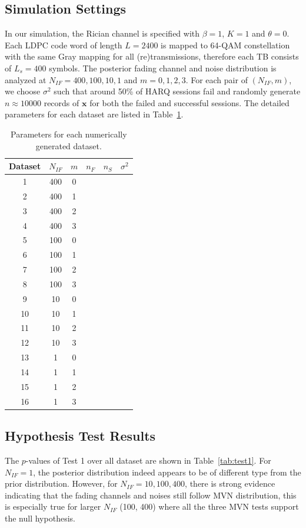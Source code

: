 \documentclass[journal,draftcls,onecolumn,12pt,twoside]{IEEEtran}
\begin{document}
\subsection{Simulation Settings}
In our simulation, the Rician channel is specified with $\beta = 1$, $K = 1$ and
$\theta = 0$. Each LDPC code word of length $L=2400$ is mapped to 64-QAM
constellation with the same Gray mapping for all (re)transmissions, therefore
each TB consists of $L_s = 400$ symbols. The posterior fading channel and noise
distribution is analyzed at $N_{IF} = 400, 100, 10, 1$ and $m = 0, 1, 2, 3$. For
each pair of $(N_{IF}, m)$, we choose $\sigma^2$ such that around 50\% of HARQ
sessions fail and randomly generate $n\approx 10000$ records of $\mathbf{x}$
for both the failed and successful sessions. %
The detailed parameters for each dataset are listed in
Table~\ref{tab:settings}.
\begin{table}[!t]
  \renewcommand{\arraystretch}{1.3}
  \caption{Parameters for each numerically generated dataset.}
  \label{tab:settings}
  \centering
  \begin{tabular}{c|ccccc}
    \hline
    Dataset & $N_{IF}$ & $m$ & $n_{F}$ & $n_{S}$ & $\sigma^2$ \\
    \hline
    1 & 400 & 0 &  & & \\
    2 & 400 & 1 &  & & \\
    3 & 400 & 2 &  & & \\
    4 & 400 & 3 &  & & \\
    \hline
    5 & 100 & 0 &  & & \\
    6 & 100 & 1 &  & & \\
    7 & 100 & 2 &  & & \\
    8 & 100 & 3 &  & & \\
    \hline
    9 & 10 & 0 &  & & \\
    10 & 10 & 1 &  & & \\
    11 & 10 & 2 &  & & \\
    12 & 10 & 3 &  & & \\
    \hline
    13 & 1 & 0 & & & \\
    14 & 1 & 1 & & & \\
    15 & 1 & 2 & & & \\
    16 & 1 & 3 & & & \\
    \hline
  \end{tabular}
\end{table}
  
\subsection{Hypothesis Test Results}
The $p$-values of Test 1 over all dataset are shown in Table~\ref{tab:test1}.
For $N_{IF} = 1$, the posterior distribution indeed appears to be of different
type from the prior distribution. However, for $N_{IF} = 10, 100, 400$, there is
strong evidence indicating that the fading channels and noises still follow MVN
distribution, this is especially true for larger $N_{IF}$ (100, 400) where all
the three MVN tests support the null hypothesis.
\end{document}
